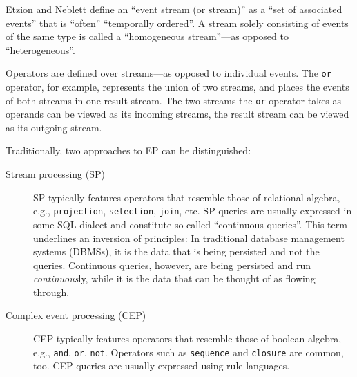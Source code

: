 \documentclass[article, 10pt, type=bsc, colorback, accentcolor=tud8b, parskip=half, bibliography=totocnumbered]{tudthesis}
\begin{document}
Etzion and Neblett \cite{Etzion:2010:EPA:1894960} define an ``event stream (or stream)'' as a ``set of associated events'' that is ``often'' ``temporally ordered''.
A stream solely consisting of events of the same type is called a ``homogeneous stream''---as opposed to ``heterogeneous''.

Operators are defined over streams---as opposed to individual events.
The \lstinline{or} operator, for example, represents the union of two streams, and places the events of both streams in one result stream.
The two streams the \lstinline{or} operator takes as operands can be viewed as its incoming streams, the result stream can be viewed as its outgoing stream.

Traditionally, two approaches to EP can be distinguished:

\begin{description}
\item[Stream processing (SP)]
SP typically features operators that resemble those of relational algebra, e.g., \lstinline{projection}, \lstinline{selection}, \lstinline{join}, etc.
SP queries are usually expressed in some SQL dialect and constitute so-called ``continuous queries''.
This term underlines an inversion of principles: In traditional database management systems (DBMSs), it is the data that is being persisted and not the queries. Continuous queries, however, are being persisted and run \emph{continuous}ly, while it is the data that can be thought of as flowing through.
\item[Complex event processing (CEP)]
CEP typically features operators that resemble those of boolean algebra, e.g., \lstinline{and}, \lstinline{or}, \lstinline{not}.
Operators such as \lstinline{sequence} and \lstinline{closure} are common, too. CEP queries are usually expressed using rule languages.
\end{description}
\end{document}
